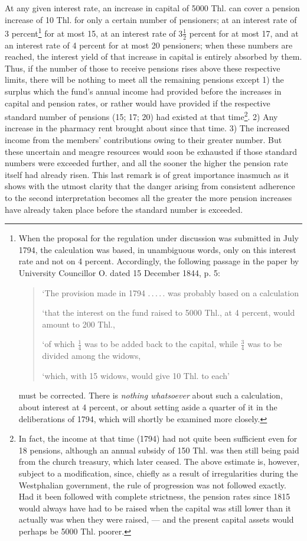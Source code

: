 At any given interest rate, an increase in capital of 5000 Thl. can cover a pension increase of 10 Thl. for only a certain number of pensioners; at an interest rate of 3 percent\footnote{When the proposal for the regulation under discussion was submitted in July 1794, the calculation was based, in unambiguous words, only on this interest rate and not on 4 percent. Accordingly, the following passage in the paper by University Councillor O. dated 15 December 1844, p. 5:
\begin{quote}\raggedright
‘The provision made in 1794 .\,.\,.\,.\,. was probably based on a calculation\par
‘that the interest on the fund raised to 5000 Thl., at 4 percent, would amount to 200 Thl.,\par
‘of which \(\tfrac14\) was to be added back to the capital, while \(\tfrac34\) was to be divided among the widows,\par
‘which, with 15 widows, would give 10 Thl. to each’
\end{quote}
must be corrected. There is \textit{nothing whatsoever} about such a calculation, about interest at 4 percent, or about setting aside a quarter of it in the deliberations of 1794, which will shortly be examined more closely.} for at most
15, at an interest rate of \(3\tfrac12\) percent for at most 17, and at an interest rate of 4 percent for at most 20 pensioners; when these numbers are reached, the interest yield of that increase in capital is entirely absorbed by them. Thus, if the number of those to receive pensions rises above these respective limits, there will be nothing to meet all the remaining pensions except 1) the surplus which the fund's annual income had provided before the increases in capital and pension rates, or rather would have provided if the respective standard number of pensions (15; 17; 20) had existed at that time\footnote{In fact, the income at that time (1794) had not quite been sufficient even for 18 pensions, although an annual subsidy of 150 Thl. was then still being paid from the church treasury, which later ceased. The above estimate is, however, subject to a modification, since, chiefly as a result of irregularities during the Westphalian government, the rule of progression was not followed exactly. Had it been followed with complete strictness, the pension rates since 1815 would always have had to be raised when the capital was still lower than it actually was when they were raised, — and the present capital assets would perhaps be 5000 Thl. poorer.}. 2) Any increase in the pharmacy rent brought about since that time. 3) The increased income from the members' contributions owing to their greater number. But these uncertain and meagre resources would soon be exhausted if those standard numbers were exceeded further, and all the sooner the higher the pension rate itself had already risen. This last remark is of great importance inasmuch as it shows with the utmost clarity that the danger arising from consistent adherence to the second interpretation becomes all the greater the more pension increases have already taken place before the standard number is exceeded.

